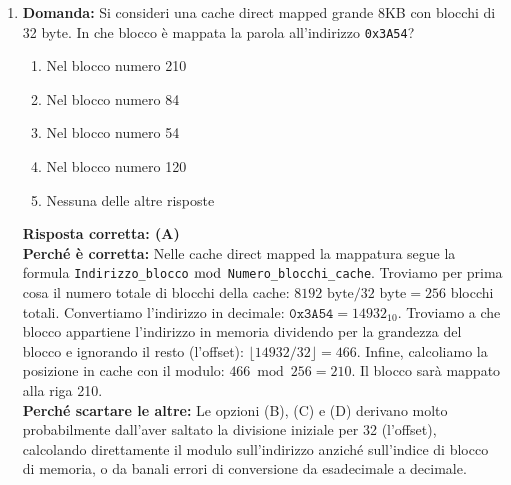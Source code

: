 \documentclass[12pt, a4paper]{article}
\begin{document}
\begin{enumerate}
    \item \textbf{Domanda:} Si consideri una cache direct mapped grande 8KB con blocchi di 32 byte. In che blocco è mappata la parola all'indirizzo \texttt{0x3A54}?
    \begin{enumerate}[label=(\Alph*)]
        \item Nel blocco numero 210
        \item Nel blocco numero 84
        \item Nel blocco numero 54
        \item Nel blocco numero 120
        \item Nessuna delle altre risposte
    \end{enumerate}
    \textbf{Risposta corretta: (A)} \\
    \textbf{Perché è corretta:} Nelle cache direct mapped la mappatura segue la formula \texttt{Indirizzo\_blocco} $\bmod$ \texttt{Numero\_blocchi\_cache}.
    Troviamo per prima cosa il numero totale di blocchi della cache: $8192\text{ byte} / 32\text{ byte} = 256$ blocchi totali.
    Convertiamo l'indirizzo in decimale: $\texttt{0x3A54} = 14932_{10}$.
    Troviamo a che blocco appartiene l'indirizzo in memoria dividendo per la grandezza del blocco e ignorando il resto (l'offset): $\lfloor 14932 / 32 \rfloor = 466$.
    Infine, calcoliamo la posizione in cache con il modulo: $466 \bmod 256 = 210$. Il blocco sarà mappato alla riga 210. \\
    \textbf{Perché scartare le altre:} Le opzioni (B), (C) e (D) derivano molto probabilmente dall'aver saltato la divisione iniziale per 32 (l'offset), calcolando direttamente il modulo sull'indirizzo anziché sull'indice di blocco di memoria, o da banali errori di conversione da esadecimale a decimale.


\end{enumerate}
\end{document}
